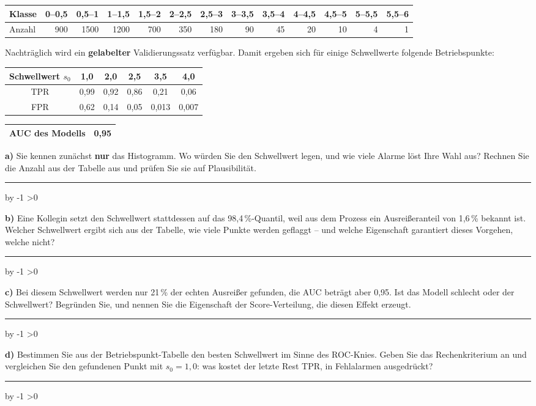 \documentclass[10pt,a4paper]{article}
\newcommand{\antwortlinien}[1]{%
  \par\vspace{2pt}%
  \newcount\zeilen \zeilen=#1
  \loop
    \noindent\rule{\linewidth}{0.4pt}\par\vspace{11pt}%
    \advance\zeilen by -1
  \ifnum\zeilen>0 \repeat
}
\begin{document}
\begin{center}\small
\begin{tabular}{|l|r|r|r|r|r|r|r|r|r|r|r|r|}
\hline
Klasse & 0--0,5 & 0,5--1 & 1--1,5 & 1,5--2 & 2--2,5 & 2,5--3 & 3--3,5 & 3,5--4 & 4--4,5 & 4,5--5 & 5--5,5 & 5,5--6\\ \hline
Anzahl & 900 & 1500 & 1200 & 700 & 350 & 180 & 90 & 45 & 20 & 10 & 4 & 1\\ \hline
\end{tabular}
\end{center}

Nachträglich wird ein \textbf{gelabelter} Validierungssatz verfügbar. Damit ergeben sich für
einige Schwellwerte folgende Betriebspunkte:

\begin{center}\small
\begin{tabular}{|c|c|c|c|c|c|}
\hline
Schwellwert $s_0$ & 1,0 & 2,0 & 2,5 & 3,5 & 4,0\\ \hline
TPR & 0,99 & 0,92 & 0,86 & 0,21 & 0,06\\ \hline
FPR & 0,62 & 0,14 & 0,05 & 0,013 & 0,007\\ \hline
\end{tabular}
\hspace{6pt}
\begin{tabular}{|l|c|}
\hline
AUC des Modells & 0,95\\ \hline
\end{tabular}
\end{center}

\textbf{a)} Sie kennen zunächst \textbf{nur} das Histogramm. Wo würden Sie den Schwellwert legen,
und wie viele Alarme löst Ihre Wahl aus? Rechnen Sie die Anzahl aus der Tabelle aus und prüfen
Sie sie auf Plausibilität.
\antwortlinien{4}

\textbf{b)} Eine Kollegin setzt den Schwellwert stattdessen auf das 98{,}4\,\%-Quantil, weil aus
dem Prozess ein Ausreißeranteil von 1,6\,\% bekannt ist. Welcher Schwellwert ergibt sich aus der
Tabelle, wie viele Punkte werden geflaggt -- und welche Eigenschaft garantiert dieses Vorgehen,
welche nicht?
\antwortlinien{4}

\textbf{c)} Bei diesem Schwellwert werden nur 21\,\% der echten Ausreißer gefunden, die AUC
beträgt aber 0,95. Ist das Modell schlecht oder der Schwellwert? Begründen Sie, und nennen Sie
die Eigenschaft der Score-Verteilung, die diesen Effekt erzeugt.
\antwortlinien{4}

\textbf{d)} Bestimmen Sie aus der Betriebspunkt-Tabelle den besten Schwellwert im Sinne des
ROC-Knies. Geben Sie das Rechenkriterium an und vergleichen Sie den gefundenen Punkt mit
$s_0 = 1{,}0$: was kostet der letzte Rest TPR, in Fehlalarmen ausgedrückt?
\antwortlinien{5}
\end{document}
